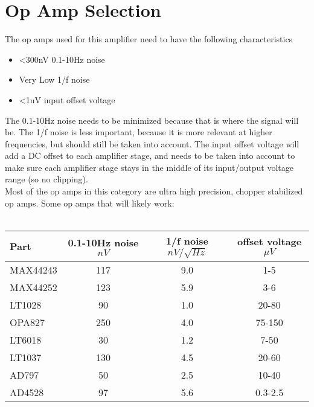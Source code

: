 \documentclass{article}
\begin{document}
\section{Op Amp Selection}
The op amps used for this amplifier need to have the following characteristics
\begin{itemize}
    \item \textless300nV 0.1-10Hz noise
    \item Very Low 1/f noise
    \item \textless1uV input offset voltage
\end{itemize}
The 0.1-10Hz noise needs to be minimized because that is where the signal will
be. The 1/f noise is less important, because it is more relevant at higher
frequencies, but should still be taken into account. The input offset voltage
will add a DC offset to each amplifier stage, and needs to be taken into
account to make sure each amplifier stage stays in the middle of its
input/output voltage range (so no clipping). \\ 
Most of the op amps in this category are ultra high precision, chopper
stabilized op amps. Some op amps that will likely work:\\ \\
\begin{tabular}{|l|c|c|c|}
    \hline
    Part & 0.1-10Hz noise $nV$ & 1/f noise $nV/\sqrt{Hz}$ & offset voltage $\mu V$ \\\hline
    MAX44243 & 117 & 9.0 & 1-5 \\\hline
    MAX44252 & 123 & 5.9 & 3-6 \\ \hline
    LT1028   & 90  & 1.0 & 20-80 \\ \hline
    OPA827   & 250 & 4.0 & 75-150 \\ \hline
    LT6018   & 30  & 1.2 & 7-50 \\ \hline
    LT1037   & 130 & 4.5 & 20-60 \\ \hline
    AD797    & 50  & 2.5 & 10-40 \\ \hline
    AD4528   & 97  & 5.6 & 0.3-2.5 \\ \hline
\end{tabular}
    
\end{document}
